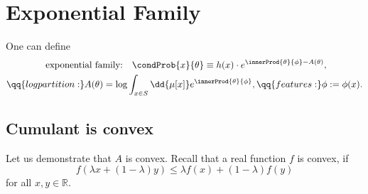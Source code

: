 \section*
{Exponential Family}

One can define 
\begin{gather*}
    \text{
    exponential 
    family:}
\quad 
    \condProb 
    {x}{\theta} 
\equiv
    h(x) 
\cdot 
    e^
    {
        \innerProd
        {\theta}
        {\phi} 
    -
        A 
        (\theta) }
        ,
\\
\qq{log partition:}
    A 
    (\theta) 
=
    \log 
    \int _{x \in S}
    \dd{\mu [x]}
    e^
    { \innerProd
      {\theta} {\phi}}
    , 
\qq{features:}
    \phi := 
    \phi (x)
    .
\end{gather*}  

\subsection* 
{Cumulant is convex}
Let us demonstrate 
that $A$ is convex.  
Recall that 
a real function $f$ is convex,  
if 
$$
    f( \lambda x + (1-\lambda) y ) 
\leq
    \lambda f(x) 
+
    (1 - \lambda) f(y)
$$  
for all $x, y \in \mathbb{R}$.

